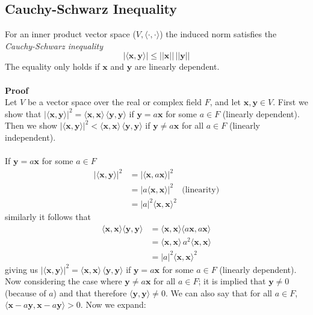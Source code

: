 \documentclass{report}
\begin{document}
\subsection{Cauchy-Schwarz Inequality} %
For an inner product vector space ($V,\langle\cdot,\cdot\rangle$) the induced norm satisfies the 
\textit{Cauchy-Schwarz inequality}
\begin{equation*}
|\langle\bm{x},\bm{y}\rangle|\leq||\bm{x}||\,||\bm{y}||
\end{equation*}
The equality only holds if $\bm{x}$ and $\bm{y}$ are linearly dependent.\\
\vspace{1mm}\\
\textbf{Proof}\\
Let $V$ be a vector space over the real or complex field $F$, and let $\bm{x},\bm{y}\in V$. First we show that
$|\langle\bm{x},\bm{y}\rangle|^2=\langle\bm{x},\bm{x}\rangle\,\langle\bm{y},\bm{y}\rangle$
if $\bm{y}=a\bm{x}$ for some $a\in F$ (linearly dependent).
Then we show $|\langle\bm{x},\bm{y}\rangle|^2<\langle\bm{x},\bm{x}\rangle\,\langle\bm{y},\bm{y}\rangle$ if 
$\bm{y}\neq a\bm{x}$ for all $a\in F$ (linearly independent).\\
\vspace{1mm}\\
If $\bm{y}=a\bm{x}$ for some $a\in F$
\begin{align*}
|\langle\bm{x},\bm{y}\rangle|^2&=|\langle\bm{x},a\bm{x}\rangle|^2\\
&=|a\langle\bm{x},\bm{x}\rangle|^2\quad\text{(linearity)}\\
&=|a|^2\langle\bm{x},\bm{x}\rangle^2
\end{align*}
similarly it follows that
\begin{align*}
\langle\bm{x},\bm{x}\rangle\langle\bm{y},\bm{y}\rangle
&=\langle\bm{x},\bm{x}\rangle\langle a\bm{x},a\bm{x}\rangle\\
&=\langle\bm{x},\bm{x}\rangle\,a^2\langle\bm{x},\bm{x}\rangle\\
&=|a|^2\langle\bm{x},\bm{x}\rangle^2
\end{align*}
giving us $|\langle\bm{x},\bm{y}\rangle|^2=\langle\bm{x},\bm{x}\rangle\,\langle\bm{y},\bm{y}\rangle$
if $\bm{y}=a\bm{x}$ for some $a\in F$ (linearly dependent). Now considering the case where
$\bm{y}\neq a\bm{x}$ for all $a\in F$; it is implied that $\bm{y}\neq0$ (because of $a$) and that therefore
$\langle\bm{y},\bm{y}\rangle\neq0$. We can also say that
for all $a\in F$, $\langle\bm{x}-a\bm{y},\bm{x}-a\bm{y}\rangle>0$. Now we expand:
\end{document}
